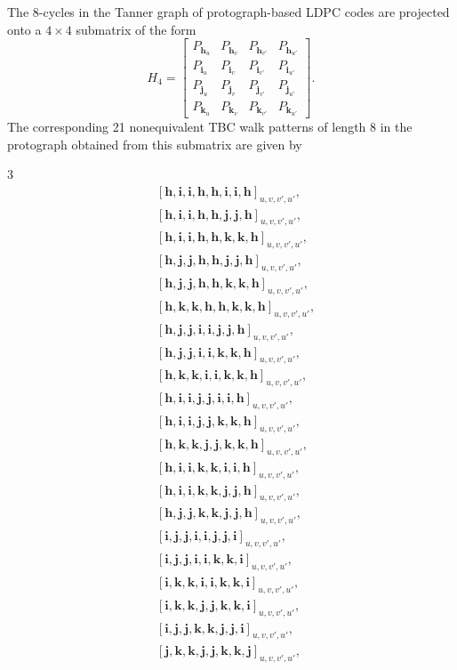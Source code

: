 \documentclass[11pt]{article}
\theoremstyle{plain}
\theoremstyle{plain}
\theoremstyle{definition}
\numberwithin{theo}{section}
\newcommand{\bh}{{\mathbf h}}
\newcommand{\bi}{{\mathbf i}}
\newcommand{\bj}{{\mathbf j}}
\newcommand{\bk}{{\mathbf k}}
\def\matrix#1{\begin{bmatrix}#1\end{bmatrix}} %
\newcounter{rom}
\begin{document}
The 8-cycles in the Tanner graph of protograph-based LDPC codes are projected onto a $4\times4$ submatrix of the form
\begin{equation*}
\label{parity_check_matrix_dyadics_4x4_submatrix}
H_4=\matrix{P_{\bh_{u}}&P_{\bh_{v}}&P_{\bh_{v'}}&P_{\bh_{u'}} \\ P_{\bi_{u}}&P_{\bi_{v}}&P_{\bi_{v'}}&P_{\bi_{u'}} \\ P_{\bj_{u}}&P_{\bj_{v}}&P_{\bj_{v'}}&P_{\bj_{u'}} \\ P_{\bk_{u}}&P_{\bk_{v}}&P_{\bk_{v'}}&P_{\bk_{u'}} }.
\end{equation*}
The corresponding 21 nonequivalent TBC walk patterns of length 8 in the protograph obtained from this submatrix are given by 
\begin{multicols}{3}
\noindent
\begin{align*}
&{[\bh,\bi,\bi,\bh,\bh,\bi,\bi,\bh]}_{u,v,v',u'}, \\
&{[\bh,\bi,\bi,\bh,\bh,\bj,\bj,\bh]}_{u,v,v',u'}, \\
&{[\bh,\bi,\bi,\bh,\bh,\bk,\bk,\bh]}_{u,v,v',u'}, \\
&{[\bh,\bj,\bj,\bh,\bh,\bj,\bj,\bh]}_{u,v,v',u'}, \\
&{[\bh,\bj,\bj,\bh,\bh,\bk,\bk,\bh]}_{u,v,v',u'}, \\
&{[\bh,\bk,\bk,\bh,\bh,\bk,\bk,\bh]}_{u,v,v',u'}, \\
&{[\bh,\bj,\bj,\bi,\bi,\bj,\bj,\bh]}_{u,v,v',u'}, \\
&{[\bh,\bj,\bj,\bi,\bi,\bk,\bk,\bh]}_{u,v,v',u'}, \\
&{[\bh,\bk,\bk,\bi,\bi,\bk,\bk,\bh]}_{u,v,v',u'}, \\
&{[\bh,\bi,\bi,\bj,\bj,\bi,\bi,\bh]}_{u,v,v',u'}, \\
&{[\bh,\bi,\bi,\bj,\bj,\bk,\bk,\bh]}_{u,v,v',u'}, \\
&{[\bh,\bk,\bk,\bj,\bj,\bk,\bk,\bh]}_{u,v,v',u'}, \\
&{[\bh,\bi,\bi,\bk,\bk,\bi,\bi,\bh]}_{u,v,v',u'}, \\
&{[\bh,\bi,\bi,\bk,\bk,\bj,\bj,\bh]}_{u,v,v',u'}, \\
&{[\bh,\bj,\bj,\bk,\bk,\bj,\bj,\bh]}_{u,v,v',u'}, \\
&{[\bi,\bj,\bj,\bi,\bi,\bj,\bj,\bi]}_{u,v,v',u'}, \\
&{[\bi,\bj,\bj,\bi,\bi,\bk,\bk,\bi]}_{u,v,v',u'}, \\
&{[\bi,\bk,\bk,\bi,\bi,\bk,\bk,\bi]}_{u,v,v',u'}, \\
&{[\bi,\bk,\bk,\bj,\bj,\bk,\bk,\bi]}_{u,v,v',u'}, \\
&{[\bi,\bj,\bj,\bk,\bk,\bj,\bj,\bi]}_{u,v,v',u'}, \\
&{[\bj,\bk,\bk,\bj,\bj,\bk,\bk,\bj]}_{u,v,v',u'},
\end{align*}
\end{multicols}
\end{document}

